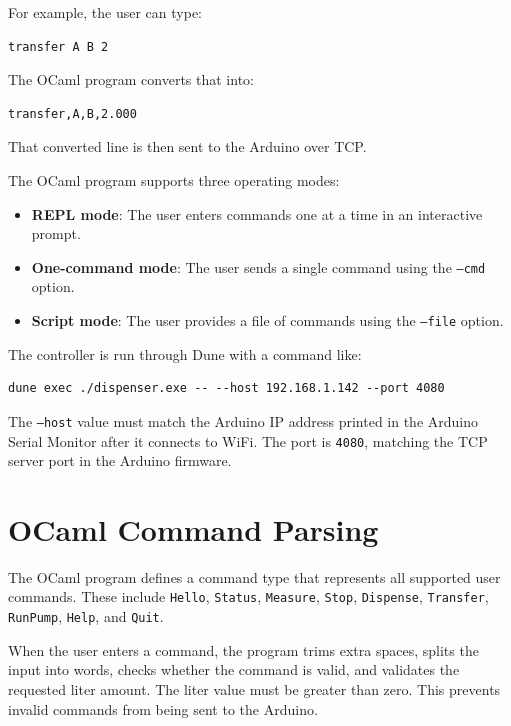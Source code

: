 For example, the user can type:

\begin{verbatim}
transfer A B 2
\end{verbatim}

The OCaml program converts that into:

\begin{verbatim}
transfer,A,B,2.000
\end{verbatim}

That converted line is then sent to the Arduino over TCP.

The OCaml program supports three operating modes:

\begin{itemize}
    \item \textbf{REPL mode}: The user enters commands one at a time in an interactive prompt.
    \item \textbf{One-command mode}: The user sends a single command using the \texttt{--cmd} option.
    \item \textbf{Script mode}: The user provides a file of commands using the \texttt{--file} option.
\end{itemize}

The controller is run through Dune with a command like:

\begin{verbatim}
dune exec ./dispenser.exe -- --host 192.168.1.142 --port 4080
\end{verbatim}

The \texttt{--host} value must match the Arduino IP address printed in the Arduino Serial Monitor after it connects to WiFi. The port is \texttt{4080}, matching the TCP server port in the Arduino firmware.

\section{OCaml Command Parsing}

The OCaml program defines a command type that represents all supported user commands. These include \texttt{Hello}, \texttt{Status}, \texttt{Measure}, \texttt{Stop}, \texttt{Dispense}, \texttt{Transfer}, \texttt{RunPump}, \texttt{Help}, and \texttt{Quit}.

When the user enters a command, the program trims extra spaces, splits the input into words, checks whether the command is valid, and validates the requested liter amount. The liter value must be greater than zero. This prevents invalid commands from being sent to the Arduino.

